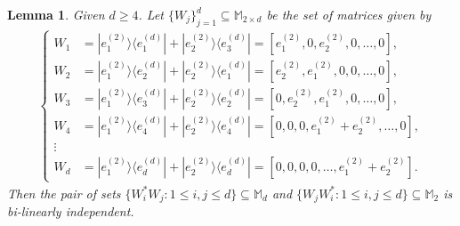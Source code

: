 \documentclass[10pt,reqno]{amsart}
\theoremstyle{definition}
\theoremstyle{plain}
\newtheorem{lem}[defn]{Lemma}
\theoremstyle{remark}
\newcommand{\mbb}[1]{\mathbb{#1}}
\newcommand{\msc}[1]{\mathscr{#1}}
\newcommand{\M}[1]{\mbb{M}_{#1}}%
\newcommand{\ranko}[2]{|{#1}\rangle\langle{#2}|}
\numberwithin{equation}{section}%
\begin{document}
\begin{lem}\label{lem-CR-d in 2 to d}
	Given $d\geq 4$. Let $\{W_j\}_{j=1}^d\subseteq\M{2\times d}$ be the set of matrices given by
	\begin{align}\label{eq-CR-d in 2 to d}
		\begin{cases}
			W_1&=\ranko{e_1^{(2)}}{e_1^{(d)}}+\ranko{e_2^{(2)}}{e_3^{(d)}}=[e_1^{(2)},0,e_2^{(2)},0,\hdots, 0],\\
			W_2&=\ranko{e_1^{(2)}}{e_2^{(d)}}+\ranko{e_2^{(2)}}{e_1^{(d)}}=[e_2^{(2)},e_1^{(2)},0,0,\hdots, 0],\\
			W_3&=\ranko{e_1^{(2)}}{e_3^{(d)}}+\ranko{e_2^{(2)}}{e_2^{(d)}}=[0,e_2^{(2)},e_1^{(2)},0,\hdots, 0],\\
			W_4&=\ranko{e_1^{(2)}}{e_4^{(d)}}+\ranko{e_2^{(2)}}{e_4^{(d)}}=[0,0,0,e_1^{(2)}+e_2^{(2)},\hdots, 0],\\
			\vdots\\
			W_d&=\ranko{e_1^{(2)}}{e_d^{(d)}}+\ranko{e_2^{(2)}}{e_d^{(d)}}=[0,0,0,0,\hdots, e_1^{(2)}+e_2^{(2)}].
		\end{cases}
	\end{align}
	Then the pair of sets $\{W_i^*W_j:1\leq i,j\leq d\}\subseteq\M{d}$ and $\{W_jW_i^*:1\leq i,j\leq d\}\subseteq\M{2}$ is bi-linearly independent.
\end{lem}
\end{document}
